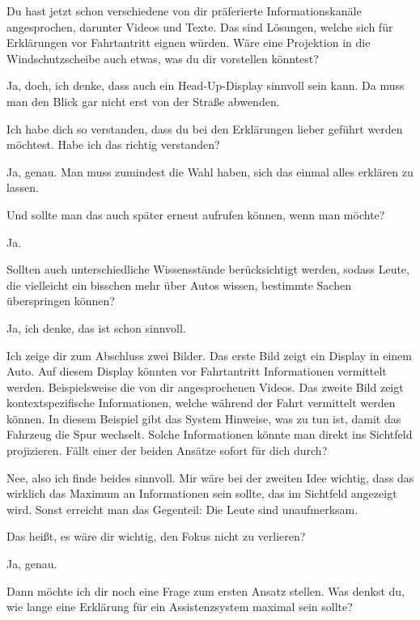 \interviewerin
Du hast jetzt schon verschiedene von dir präferierte Informationskanäle
angesprochen, darunter Videos und Texte. Das sind Lösungen, welche sich
für Erklärungen vor Fahrtantritt eignen würden. Wäre eine Projektion in
die Windschutzscheibe auch etwas, was du dir vorstellen könntest?

Ja, doch, ich denke, dass auch ein Head-Up-Display sinnvoll sein kann.
Da muss man den Blick gar nicht erst von der Straße abwenden.

\interviewerin
Ich habe dich so verstanden, dass du bei den Erklärungen lieber geführt
werden möchtest. Habe ich das richtig verstanden?

Ja, genau. Man muss zumindest die Wahl haben, sich das einmal alles
erklären zu lassen.

\interviewerin
Und sollte man das auch später erneut aufrufen können, wenn man möchte?

Ja.

\interviewerin
Sollten auch unterschiedliche Wissensstände berücksichtigt werden,
sodass Leute, die vielleicht ein bisschen mehr über Autos wissen,
bestimmte Sachen überspringen können?

Ja, ich denke, das ist schon sinnvoll.

\interviewerin
Ich zeige dir zum Abschluss zwei Bilder. Das erste Bild zeigt ein
Display in einem Auto. Auf diesem Display könnten vor Fahrtantritt
Informationen vermittelt werden. Beispielsweise die von dir
angesprochenen Videos. Das zweite Bild zeigt kontextspezifische
Informationen, welche während der Fahrt vermittelt werden können. In
diesem Beispiel gibt das System Hinweise, was zu tun ist, damit das
Fahrzeug die Spur wechselt. Solche Informationen könnte man direkt ins
Sichtfeld projizieren. Fällt einer der beiden Ansätze sofort für dich
durch?

Nee, also ich finde beides sinnvoll. Mir wäre bei der zweiten Idee
wichtig, dass das wirklich das Maximum an Informationen sein sollte, das
im Sichtfeld angezeigt wird. Sonst erreicht man das Gegenteil: Die
Leute sind unaufmerksam.

\interviewerin
Das heißt, es wäre dir wichtig, den Fokus nicht zu verlieren?

Ja, genau.

\interviewerin
Dann möchte ich dir noch eine Frage zum ersten Ansatz stellen. Was
denkst du, wie lange eine Erklärung für ein Assistenzsystem maximal sein
sollte?

